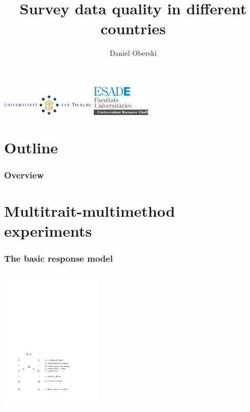 \documentclass{beamer}
\title{Survey data quality in different countries}
\author{Daniel Oberski}
\institute
{
  \inst{}%
  Faculty of Social and Behavioural Sciences\\
  Tilburg University
  \and
  \inst{}%
  Survey Research Centre\\
  ESADE, Barcelona\\
  Universitat Ramon Llull\vspace{-1.2cm}
}
\date{}
\begin{document}
\begin{frame}
	\titlepage
	\begin{center}
	 \includegraphics[width=4.5cm]{i/uvttransparent.png}\hspace{.2cm}
	 \includegraphics[width=2.8cm]{i/esade.png}	
  \end{center}	
\end{frame}

\section*{Outline}

\begin{frame}
\frametitle{Overview}
	\tableofcontents
\end{frame}

\section{Multitrait-multimethod experiments}

\begin{frame}
	\frametitle{The basic response model}
	\includegraphics[height=7cm]{i/response-model.pdf}\\
\end{frame}
\end{document}
